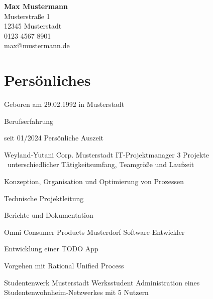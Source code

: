 \documentclass{germancv}
\begin{document}
\begin{flushright}
  \textbf{\large Max Mustermann}\\
  Musterstraße 1\\
  12345 Musterstadt\\
  0123 4567 8901\\
  max@mustermann.de\\
\end{flushright}

\vspace{3em}

\section*{Persönliches}

Geboren am 29.02.1992 in Musterstadt

\begin{cvsection}{Berufserfahrung}
  \begin{cvitembold}
      {seit 01/2024}
    Persönliche Auszeit
  \end{cvitembold}
  \begin{cvitemlist}
      {}
      {Weyland-Yutani Corp.}
      {Musterstadt}
      {IT-Projektmanager}
      {3 Projekte \textendash\ unterschiedlicher Tätigkeitsumfang, Teamgröße und Laufzeit}
    \item Konzeption, Organisation und Optimierung von Prozessen
    \item Technische Projektleitung
    \item Berichte und Dokumentation
  \end{cvitemlist}
  \begin{cvitemlist}
      {}
      {Omni Consumer Products}
      {Musterdorf}
      {Software-Entwickler}
      {}
    \item Entwicklung einer TODO App
    \item Vorgehen mit Rational Unified Process
  \end{cvitemlist}
  \begin{cvitem}
      {}
      {Studentenwerk}
      {Musterstadt}
      {Werksstudent}
      {Administration eines Studentenwohnheim-Netzwerkes mit 5 Nutzern}
  \end{cvitem}
\end{cvsection}
\end{document}

